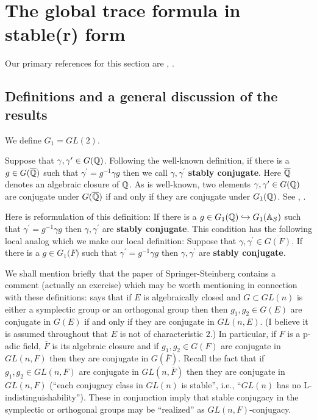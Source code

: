 
\section{The global trace formula in stable(r) form}\label{sec:stable}

Our primary references for this section are \cite{LL}, \cite{L3}.
\subsection{Definitions and a general discussion of the results}

We define $G_1=GL(2)$. 

Suppose that $\gamma ,\gamma ^{\prime }\in G(\mathbb{Q} )$. Following the
well-known definition, if there is a $g\in G(\overline{\mathbb{Q} })$ such that $%
\gamma ^{\prime }=g^{-1}\gamma g$ then we call $\gamma ,\gamma ^{\prime }$ 
\textbf{stably conjugate}. Here $\overline{\mathbb{Q} }$ denotes an algebraic
closure of $\mathbb{Q} $. As is well-known, two elements $\gamma ,\gamma
^{\prime }\in G(\mathbb{Q} )$ are conjugate under
$G(\overline{\mathbb{Q} })$ if and
only if they are conjugate under $G_1(\mathbb{Q} )$. See \cite{L3}, \cite{LL}.

Here is reformulation of this definition: If there is a
$g\in G_1(\mathbb{Q} )\hookrightarrow G_1(\mathbb{A} _S)$ such
that $\gamma ^{\prime}=g^{-1}\gamma g$ then
$\gamma ,\gamma ^{\prime }$ are \textbf{stably conjugate}.
This condition has the following local analog which we make our
local definition:
Suppose that $\gamma ,\gamma ^{\prime }\in \overline{G(F)}$. If there
is a $g\in G_1(F\mathbb{)}$ such that 
$\gamma ^{\prime }=g^{-1}\gamma g$ then $\gamma ,\gamma ^{\prime }$ are 
\textbf{stably conjugate}.

\begin{remark}\label{rem:7.1}
We shall mention briefly that the paper of Springer-Steinberg
contains a comment (actually an exercise)
which may be worth mentioning in connection with
these definitions: \cite[ch IV, (2.15)]{SpSt} says that if $E$ is
algebraically closed and $G\subset GL(n)$ is either a symplectic
group or an orthogonal group then then $g_1,g_2\in G(E)$ are
conjugate in $G(E)$ if and only if they are conjugate in $GL(n,E)$.
(I believe it is assumed throughout that $E$ is not of characteristic $2$.)
In particular, if $F$ is a p-adic field, $\overline{F}$ is its
algebraic closure and if $g_1,g_2\in G(F)$ are conjugate in
$GL(n,F)$ then they are conjugate in $G(\overline{F})$.
Recall the fact that if $g_1,g_2\in GL(n,F)$
are conjugate in $GL(n,\overline{F})$
then they are conjugate in $GL(n,{F})$ (``each conjugacy class
in $GL(n)$ is stable'', i.e., ``$GL(n)$ has no L-indistinguishability'').
These in conjunction imply that stable conjugacy in the
symplectic or orthogonal groups may be ``realized'' as
$GL(n,F)$-conjugacy.
\end{remark}

